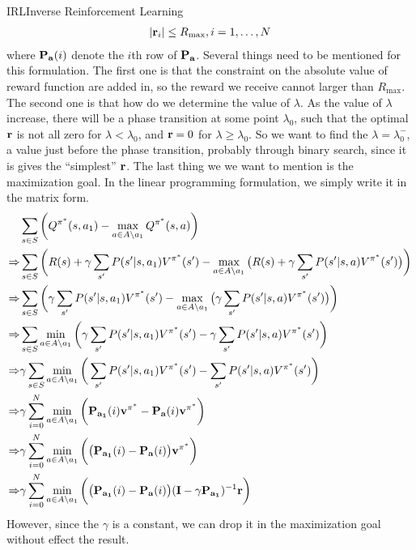 \documentclass[9pt]{article}
\begin{document}
\begin{topic}{IRL}{Inverse Reinforcement Learning}
\[\begin{split}
& \quad |\mathbf{r}_i| \le R_{\text{max}}, i = 1, \ldots, N
\end{split}
\]
where $\mathbf{P_{a}}(i)$ denote the $i$th row of $\mathbf{P_{a}}$. Several things need to be mentioned for this formulation. The first one is that  the constraint on the absolute value of reward function are added in, so the reward we receive cannot larger than $R_{\text{max}}$. The second one is that how do we determine the value of $\lambda$. As the value of $\lambda$ increase, there will be a phase transition at some point $\lambda_0$, such that the optimal $\mathbf{r}$ is not all zero for $\lambda < \lambda_0$, and $\mathbf{r} = 0$ for $\lambda \ge \lambda_0$. So we want to find the $\lambda = \lambda_0^{-}$, a value just before the phase transition, probably through binary search, since it is gives the ``simplest'' $\mathbf{r}$. The last thing we we want to mention is the maximization goal. In the linear programming formulation, we simply write it in the matrix form.
\[
\begin{split}
	& \sum_{s\in S} \bigg(Q^{\pi^*}(s, a_1) - \max_{a\in A\backslash a_1}Q^{\pi^*}(s,a)\bigg)\\
\Rightarrow & \sum_{s\in S} \bigg(R(s) + \gamma \sum_{s'}P(s'|s,a_1)V^{\pi^*}(s') - \max_{a\in A\backslash a_1} \big(R(s) + \gamma \sum_{s'}P(s'|s,a)V^{\pi^*}(s')\big)\bigg)\\
\Rightarrow & \sum_{s\in S} \bigg(\gamma \sum_{s'}P(s'|s,a_1)V^{\pi^*}(s') - \max_{a\in A\backslash a_1} \big(\gamma \sum_{s'}P(s'|s,a)V^{\pi^*}(s')\big)\bigg)\\
\Rightarrow & \sum_{s\in S} \min_{a\in A\backslash a_1} \bigg(\gamma \sum_{s'}P(s'|s,a_1)V^{\pi^*}(s') -  \gamma \sum_{s'}P(s'|s,a)V^{\pi^*}(s')\bigg)\\ 
\Rightarrow & \gamma \sum_{s\in S} \min_{a\in A\backslash a_1} \bigg(\sum_{s'}P(s'|s,a_1)V^{\pi^*}(s') -  \sum_{s'}P(s'|s,a)V^{\pi^*}(s')\bigg)\\ 
\Rightarrow & \gamma \sum_{i=0}^{N} \min_{a\in A\backslash a_1} \bigg(\mathbf{P_{a_1}}(i)  \mathbf{v^{\pi^*}} -  \mathbf{P_a}(i)  \mathbf{v^{\pi^*}}\bigg)\\ 
\Rightarrow & \gamma \sum_{i=0}^{N} \min_{a\in A\backslash a_1} \bigg(\big(\mathbf{P_{a_1}}(i)  -  \mathbf{P_a}(i)\big) \mathbf{v^{\pi^*}}\bigg)\\ 
\Rightarrow & \gamma \sum_{i=0}^{N} \min_{a\in A\backslash a_1} \bigg(\big(\mathbf{P_{a_1}}(i)  -  \mathbf{P_a}(i)\big) (\mathbf{I} - \gamma\mathbf{P_{a_1}})^{-1} \mathbf{r}\bigg)\\
\end{split}
\]
However, since the $\gamma$ is a constant, we can drop it in the maximization goal without effect the result.

\end{topic}
\end{document}
